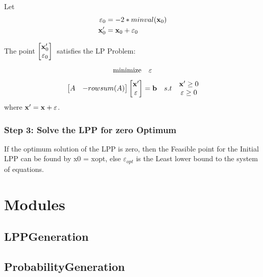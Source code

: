 \documentclass{report}
\begin{document}
Let
\begin{align*}
	\varepsilon_0 &= -2*minval(\mathbf x_{0}) \\
	\mathbf x_{0}' &= \mathbf x_{0} + \varepsilon_0
\end{align*}

The point $\begin{bmatrix} \mathbf x_{0}' \\ \varepsilon_0\end{bmatrix}$\ satisfies the LP Problem:

$$\text{minimize\quad}\varepsilon$$

\begin{align*}
	\begin{bmatrix}
		A &  -rowsum(A)
	\end{bmatrix}
	\begin{bmatrix}
		\mathbf x' \\
		\varepsilon
	\end{bmatrix}
	= \mathbf b
	\quad s.t\quad
	\begin{matrix}
		\mathbf x' \ge 0  \\
		\varepsilon \ge 0
	\end{matrix}
\end{align*}
where $\mathbf x' = \mathbf x + \varepsilon$.

\subsubsection*{Step 3: Solve the LPP for zero Optimum}
If the optimum solution of the LPP is zero, then the Feasible point for the Initial LPP can be found by \vei x0 = \veid x{opt}, else $\varepsilon_{opt}$ is the Least lower bound to the system of equations.

\pagebreak
\vspace{1cm}

\pagebreak

\section{Modules}
\subsection{LPPGeneration}
\subsection{ProbabilityGeneration}
\end{document}

